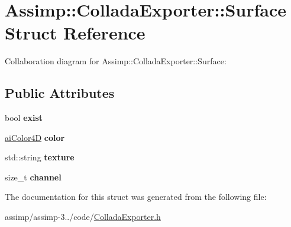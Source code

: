 \hypertarget{struct_assimp_1_1_collada_exporter_1_1_surface}{\section{Assimp\+:\+:Collada\+Exporter\+:\+:Surface Struct Reference}
\label{struct_assimp_1_1_collada_exporter_1_1_surface}
}


Collaboration diagram for Assimp\+:\+:Collada\+Exporter\+:\+:Surface\+:
\subsection*{Public Attributes}
\begin{DoxyCompactItemize}
\item 
\hypertarget{struct_assimp_1_1_collada_exporter_1_1_surface_a922959b5ab7aa113b1431693d7319873}{bool {\bfseries exist}}\label{struct_assimp_1_1_collada_exporter_1_1_surface_a922959b5ab7aa113b1431693d7319873}

\item 
\hypertarget{struct_assimp_1_1_collada_exporter_1_1_surface_adddbfa0b79c8666cfaf7de1be4fe010a}{\hyperlink{structai_color4_d}{ai\+Color4\+D} {\bfseries color}}\label{struct_assimp_1_1_collada_exporter_1_1_surface_adddbfa0b79c8666cfaf7de1be4fe010a}

\item 
\hypertarget{struct_assimp_1_1_collada_exporter_1_1_surface_a14d9c1eb78e8f883dd1daa0e00068cc3}{std\+::string {\bfseries texture}}\label{struct_assimp_1_1_collada_exporter_1_1_surface_a14d9c1eb78e8f883dd1daa0e00068cc3}

\item 
\hypertarget{struct_assimp_1_1_collada_exporter_1_1_surface_a010ebfc348f4def575783670cb054d9a}{size\+\_\+t {\bfseries channel}}\label{struct_assimp_1_1_collada_exporter_1_1_surface_a010ebfc348f4def575783670cb054d9a}

\end{DoxyCompactItemize}


The documentation for this struct was generated from the following file\+:\begin{DoxyCompactItemize}
\item 
assimp/assimp-\/3../code/\hyperlink{_collada_exporter_8h}{Collada\+Exporter.\+h}\end{DoxyCompactItemize}
